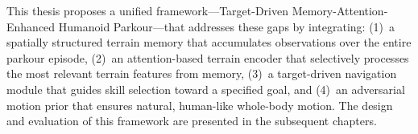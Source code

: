 This thesis proposes a unified framework---Target-Driven Memory-Attention-Enhanced Humanoid Parkour---that addresses these gaps by integrating: (1)~a spatially structured terrain memory that accumulates observations over the entire parkour episode, (2)~an attention-based terrain encoder that selectively processes the most relevant terrain features from memory, (3)~a target-driven navigation module that guides skill selection toward a specified goal, and (4)~an adversarial motion prior that ensures natural, human-like whole-body motion. The design and evaluation of this framework are presented in the subsequent chapters.